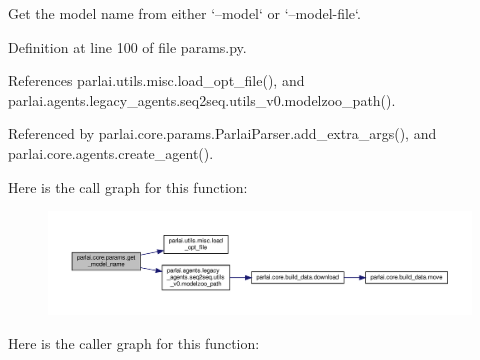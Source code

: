 \begin{DoxyVerb}Get the model name from either `--model` or `--model-file`.\end{DoxyVerb}
 

Definition at line 100 of file params.\+py.



References parlai.\+utils.\+misc.\+load\+\_\+opt\+\_\+file(), and parlai.\+agents.\+legacy\+\_\+agents.\+seq2seq.\+utils\+\_\+v0.\+modelzoo\+\_\+path().



Referenced by parlai.\+core.\+params.\+Parlai\+Parser.\+add\+\_\+extra\+\_\+args(), and parlai.\+core.\+agents.\+create\+\_\+agent().

Here is the call graph for this function\+:
\nopagebreak
\begin{figure}[H]
\begin{center}
\leavevmode
\includegraphics[width=350pt]{namespaceparlai_1_1core_1_1params_a6d160324f6af84562334fd0698141074_cgraph}
\end{center}
\end{figure}
Here is the caller graph for this function\+:
\nopagebreak
